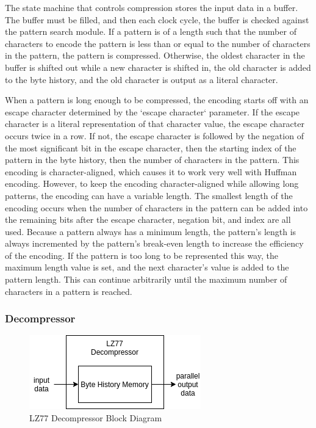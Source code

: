 \documentclass[doublespace,nopageskip]{VTthesis}
\begin{document}
The state machine that controls compression stores the input data in a buffer. The buffer must be filled, and then each clock cycle, the buffer is checked against the pattern search module. If a pattern is of a length such that the number of characters to encode the pattern is less than or equal to the number of characters in the pattern, the pattern is compressed. Otherwise, the oldest character in the buffer is shifted out while a new character is shifted in, the old character is added to the byte history, and the old character is output as a literal character.

When a pattern is long enough to be compressed, the encoding starts off with an escape character determined by the `escape character` parameter. If the escape character is a literal representation of that character value, the escape character occurs twice in a row. If not, the escape character is followed by the negation of the most significant bit in the escape character, then the starting index of the pattern in the byte history, then the number of characters in the pattern. This encoding is character-aligned, which causes it to work very well with Huffman encoding. However, to keep the encoding character-aligned while allowing long patterns, the encoding can have a variable length. The smallest length of the encoding occurs when the number of characters in the pattern can be added into the remaining bits after the escape character, negation bit, and index are all used. Because a pattern always has a minimum length, the pattern's length is always incremented by the pattern's break-even length to increase the efficiency of the encoding. If the pattern is too long to be represented this way, the maximum length value is set, and the next character's value is added to the pattern length. This can continue arbitrarily until the maximum number of characters in a pattern is reached. 

\subsubsection{Decompressor}\label{sss:lz77_decompressor_implementation}

\begin{figure}[htb]
	\centering
	\includegraphics[scale=1]{LZ77 Decompressor.png}
	\caption{LZ77 Decompressor Block Diagram}
	\label{fig:lz77_decompressor_block_diagram}
\end{figure}
\end{document}
